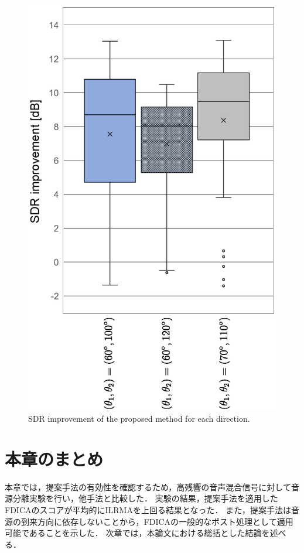 \begin{figure}[th]
    \vspace{4pt}
    \begin{center}
        \includegraphics[width=0.7\columnwidth]{figures/sdr_glaph_DOA.eps}
    \end{center}
    \vspace{-8pt}
	\caption{SDR improvement of the proposed method for each direction.}
	\label{fig:DOA}
\end{figure}



\clearpage
\section{本章のまとめ}
\label{sec:matome}
本章では，提案手法の有効性を確認するため，高残響の音声混合信号に対して音源分離実験を行い，他手法と比較した．
実験の結果，提案手法を適用したFDICAのスコアが平均的にILRMAを上回る結果となった．
また，提案手法は音源の到来方向に依存しないことから，FDICAの一般的なポスト処理として適用可能であることを示した．
次章では，本論文における総括とした結論を述べる．

